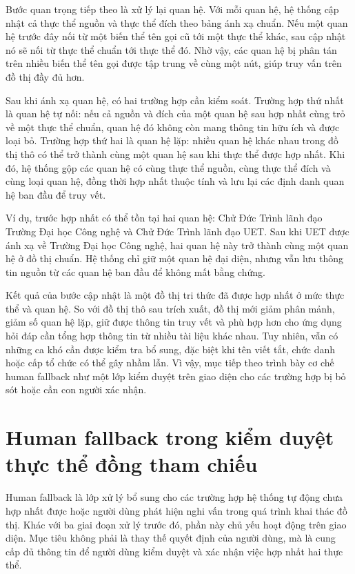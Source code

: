 Bước quan trọng tiếp theo là xử lý lại quan hệ. Với mỗi quan hệ, hệ thống cập nhật cả thực thể nguồn và thực thể đích theo bảng ánh xạ chuẩn. Nếu một quan hệ trước đây nối từ một biến thể tên gọi cũ tới một thực thể khác, sau cập nhật nó sẽ nối từ thực thể chuẩn tới thực thể đó. Nhờ vậy, các quan hệ bị phân tán trên nhiều biến thể tên gọi được tập trung về cùng một nút, giúp truy vấn trên đồ thị đầy đủ hơn.

Sau khi ánh xạ quan hệ, có hai trường hợp cần kiểm soát. Trường hợp thứ nhất là quan hệ tự nối: nếu cả nguồn và đích của một quan hệ sau hợp nhất cùng trỏ về một thực thể chuẩn, quan hệ đó không còn mang thông tin hữu ích và được loại bỏ. Trường hợp thứ hai là quan hệ lặp: nhiều quan hệ khác nhau trong đồ thị thô có thể trở thành cùng một quan hệ sau khi thực thể được hợp nhất. Khi đó, hệ thống gộp các quan hệ có cùng thực thể nguồn, cùng thực thể đích và cùng loại quan hệ, đồng thời hợp nhất thuộc tính và lưu lại các định danh quan hệ ban đầu để truy vết.

Ví dụ, trước hợp nhất có thể tồn tại hai quan hệ: Chử Đức Trình lãnh đạo Trường Đại học Công nghệ và Chử Đức Trình lãnh đạo UET. Sau khi UET được ánh xạ về Trường Đại học Công nghệ, hai quan hệ này trở thành cùng một quan hệ ở đồ thị chuẩn. Hệ thống chỉ giữ một quan hệ đại diện, nhưng vẫn lưu thông tin nguồn từ các quan hệ ban đầu để không mất bằng chứng.

Kết quả của bước cập nhật là một đồ thị tri thức đã được hợp nhất ở mức thực thể và quan hệ. So với đồ thị thô sau trích xuất, đồ thị mới giảm phân mảnh, giảm số quan hệ lặp, giữ được thông tin truy vết và phù hợp hơn cho ứng dụng hỏi đáp cần tổng hợp thông tin từ nhiều tài liệu khác nhau. Tuy nhiên, vẫn có những ca khó cần được kiểm tra bổ sung, đặc biệt khi tên viết tắt, chức danh hoặc cấp tổ chức có thể gây nhầm lẫn. Vì vậy, mục tiếp theo trình bày cơ chế human fallback như một lớp kiểm duyệt trên giao diện cho các trường hợp bị bỏ sót hoặc cần con người xác nhận.


\section{Human fallback trong kiểm duyệt thực thể đồng tham chiếu}

Human fallback là lớp xử lý bổ sung cho các trường hợp hệ thống tự động chưa hợp nhất được hoặc người dùng phát hiện nghi vấn trong quá trình khai thác đồ thị. Khác với ba giai đoạn xử lý trước đó, phần này chủ yếu hoạt động trên giao diện. Mục tiêu không phải là thay thế quyết định của người dùng, mà là cung cấp đủ thông tin để người dùng kiểm duyệt và xác nhận việc hợp nhất hai thực thể.

